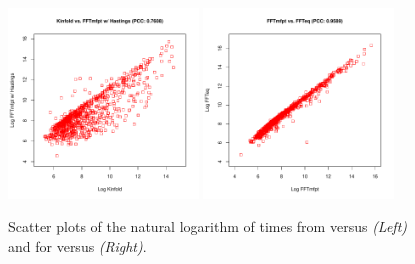 \documentclass[11pt, oneside]{Thesis} %
\providecommand{\DIFaddbeginFL}{} %
\providecommand{\DIFaddendFL}{} %
\providecommand{\DIFdelbeginFL}{} %
\providecommand{\DIFdelendFL}{} %
\begin{document}
\begin{figure}[!ht]
\centering
\includegraphics[width=0.45\textwidth]{Figures/Hermes/kinfoldFftMfptHastings.pdf}
\quad
\includegraphics[width=0.45\textwidth]{Figures/Hermes/fftMfptFftEq.pdf}
\DIFdelbeginFL %
\DIFdelendFL \DIFaddbeginFL \caption[Scatter plots of the natural logarithm of times from \kinfold
versus  {\em (Left)} and for \fftmfpt versus 
{\em (Right)}]{\DIFaddendFL Scatter plots of the natural logarithm of times from \kinfold
versus  {\em (Left)} and for \fftmfpt versus 
{\em (Right)}.}
\label{fig:hermes:scatterplotFftMfptVsKinfoldAndFftEq}
\end{figure}
\end{document}
